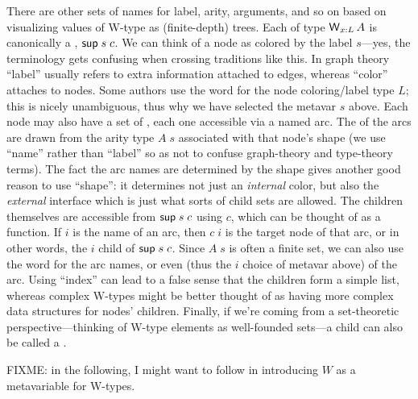 \documentclass[11pt]{article} %
\theoremstyle{definition}
\theoremstyle{remark}
\begin{document}
There are other sets of names for label, arity, arguments, and so on based on visualizing values of W-type as (finite-depth) trees.
Each  of type $\operatorname{\mathsf{W}}_{x:L}A$ is canonically a , $\mathsf{sup}\;s\;c$.
We can think of a node as colored by the label $s$---yes, the terminology gets confusing when crossing traditions like this.
In graph theory ``label'' usually refers to extra information attached to edges, whereas ``color'' attaches to nodes.
Some authors use the word  for the node coloring/label type $L$; this is nicely unambiguous, thus why we have selected the metavar $s$ above.
Each node may also have a set of , each one accessible via a named arc.
The  of the arcs are drawn from the arity type $A\;s$ associated with that node's shape (we use ``name'' rather than ``label'' so as not to confuse graph-theory and type-theory terms).
The fact the arc names are determined by the shape gives another good reason to use ``shape'': it determines not just an \emph{internal} color, but also the \emph{external} interface which is just what sorts of child sets are allowed.
The children themselves are accessible from $\mathsf{sup}\;s\;c$ using $c$, which can be thought of as a  function.
If $i$ is the name of an arc, then $c\;i$ is the target node of that arc, or in other words, the $i$\supth{} child of $\mathsf{sup}\;s\;c$.
Since $A\;s$ is often a finite set, we can also use the word  for the arc names, or even  (thus the $i$ choice of metavar above) of the arc.
Using ``index'' can lead to a false sense that the children form a simple list, whereas complex W-types might be better thought of as having more complex data structures for nodes' children.
Finally, if we're coming from a set-theoretic perspective---thinking of W-type elements as well-founded sets---a child can also be called a .

FIXME: in the following, I might want to follow \cite{awodey-etal_2012} in introducing $W$ as a metavariable for W-types.
\end{document}
